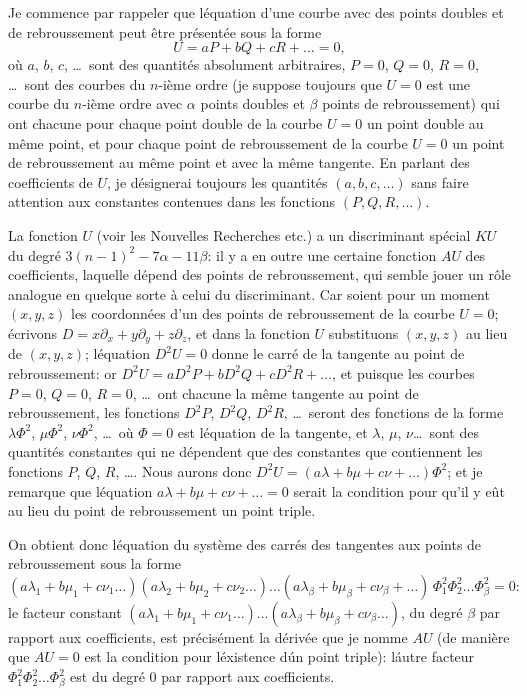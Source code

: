 \documentclass[11pt,a4paper]{article}
\theoremstyle{plain}
\begin{document}
Je commence par rappeler que l\'equation d'une courbe avec des points doubles et de rebroussement peut \^etre pr\'esent\'ee sous la forme
\[
U = aP + bQ + cR + \ldots = 0,
\]
o\`u $a$, $b$, $c$, \ldots\ sont des quantit\'es absolument arbitraires, $P=0$, $Q=0$, $R=0$, \ldots\ sont des courbes du $n$-i\`eme ordre (je suppose toujours que $U=0$ est une courbe du $n$-i\`eme ordre avec $\alpha$ points doubles et $\beta$ points de rebroussement) qui ont chacune pour chaque point double de la courbe $U=0$ un point double au m\^eme point, et pour chaque point de rebroussement de la courbe $U=0$ un point de rebroussement au m\^eme point et avec la m\^eme tangente. En parlant des coefficients de $U$, je d\'esignerai toujours les quantit\'es $(a, b, c, \ldots)$ sans faire attention aux constantes contenues dans les fonctions $(P, Q, R, \ldots)$.

La fonction $U$ (voir les Nouvelles Recherches etc.) a un discriminant sp\'ecial $KU$ du degr\'e $3(n-1)^2 - 7\alpha - 11\beta$: il y a en outre une certaine fonction $AU$ des coefficients, laquelle d\'epend des points de rebroussement, qui semble jouer un r\^ole analogue en quelque sorte \`a celui du discriminant. Car soient pour un moment $(x, y, z)$ les coordonn\'ees d'un des points de rebroussement de la courbe $U=0$; \'ecrivons $D = x\partial_x + y\partial_y + z\partial_z$, et dans la fonction $U$ substituons $(x, y, z)$ au lieu de $(x, y, z)$; l\'equation $D^2U = 0$ donne le carr\'e de la tangente au point de rebroussement: or $D^2U = aD^2P + bD^2Q + cD^2R + \ldots$, et puisque les courbes $P=0$, $Q=0$, $R=0$, \ldots\ ont chacune la m\^eme tangente au point de rebroussement, les fonctions $D^2P$, $D^2Q$, $D^2R$, \ldots\ seront des fonctions de la forme $\lambda\Phi^2$, $\mu\Phi^2$, $\nu\Phi^2$, \ldots\ o\`u $\Phi=0$ est l\'equation de la tangente, et $\lambda$, $\mu$, $\nu$\ldots\ sont des quantit\'es constantes qui ne d\'ependent que des constantes que contiennent les fonctions $P$, $Q$, $R$, \ldots. Nous aurons donc $D^2U = (a\lambda + b\mu + c\nu + \ldots)\Phi^2$; et je remarque que l\'equation $a\lambda + b\mu + c\nu + \ldots = 0$ serait la condition pour qu'il y e\^ut au lieu du point de rebroussement un point triple.

On obtient donc l\'equation du syst\`eme des carr\'es des tangentes aux points de rebroussement sous la forme
\[
(a\lambda_1 + b\mu_1 + c\nu_1 \ldots)(a\lambda_2 + b\mu_2 + c\nu_2 \ldots)\ldots(a\lambda_\beta + b\mu_\beta + c\nu_\beta + \ldots)\, \Phi_1^2 \Phi_2^2 \ldots \Phi_\beta^2 = 0:
\]
le facteur constant $(a\lambda_1 + b\mu_1 + c\nu_1\ldots)\ldots(a\lambda_\beta + b\mu_\beta + c\nu_\beta\ldots)$, du degr\'e $\beta$ par rapport aux coefficients, est pr\'ecis\'ement la d\'eriv\'ee que je nomme $AU$ (de mani\`ere que $AU=0$ est la condition pour l\'existence d\'un point triple): l\'autre facteur $\Phi_1^2 \Phi_2^2 \ldots \Phi_\beta^2$ est du degr\'e 0 par rapport aux coefficients.
\end{document}
